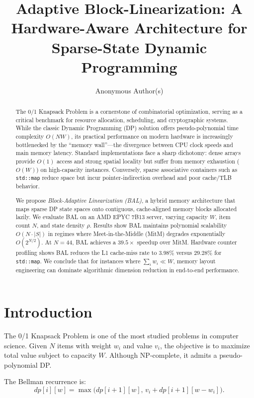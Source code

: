 \documentclass[a4paper,USenglish]{lipics-v2021}
\title{Adaptive Block-Linearization: A Hardware-Aware Architecture for Sparse-State Dynamic Programming}
\author{Anonymous Author(s)}{Anonymous Institution}{anonymous@anonymous.com}{}{}
\begin{document}
\maketitle

\begin{abstract}
The 0/1 Knapsack Problem is a cornerstone of combinatorial optimization, serving as a critical benchmark for resource allocation, scheduling, and cryptographic systems. While the classic Dynamic Programming (DP) solution offers pseudo-polynomial time complexity $O(NW)$, its practical performance on modern hardware is increasingly bottlenecked by the ``memory wall''---the divergence between CPU clock speeds and main memory latency. Standard implementations face a sharp dichotomy: dense arrays provide $O(1)$ access and strong spatial locality but suffer from memory exhaustion ($O(W)$) on high-capacity instances. Conversely, sparse associative containers such as \texttt{std::map} reduce space but incur pointer-indirection overhead and poor cache/TLB behavior.

We propose \emph{Block-Adaptive Linearization (BAL)}, a hybrid memory architecture that maps sparse DP state spaces onto contiguous, cache-aligned memory blocks allocated lazily. We evaluate BAL on an AMD EPYC 7B13 server, varying capacity $W$, item count $N$, and state density $\rho$. Results show BAL maintains polynomial scalability $O(N\cdot|S|)$ in regimes where Meet-in-the-Middle (MitM) degrades exponentially $O(2^{N/2})$. At $N=44$, BAL achieves a $39.5\times$ speedup over MitM. Hardware counter profiling shows BAL reduces the L1 cache-miss rate to $3.98\%$ versus $29.28\%$ for \texttt{std::map}. We conclude that for instances where $\sum_i w_i \ll W$, memory layout engineering can dominate algorithmic dimension reduction in end-to-end performance.
\end{abstract}

\section{Introduction}
The 0/1 Knapsack Problem is one of the most studied problems in computer science. Given $N$ items with weight $w_i$ and value $v_i$, the objective is to maximize total value subject to capacity $W$. Although NP-complete, it admits a pseudo-polynomial DP.

The Bellman recurrence is:
\begin{equation}\label{eq:dp}
dp[i][w] = \max\bigl(dp[i+1][w],\, v_i + dp[i+1][w-w_i]\bigr).
\end{equation}
\end{document}
